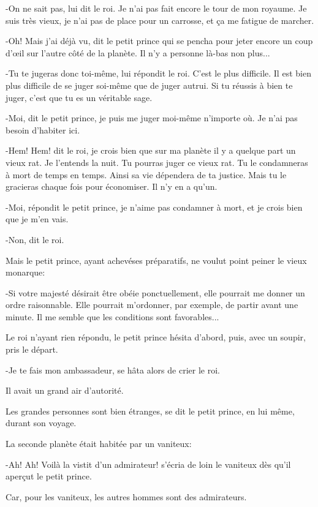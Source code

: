 \documentclass{report}
\begin{document}
-On ne sait pas, lui dit le roi. Je n'ai pas fait encore le tour de mon royaume. Je suis très vieux, je n'ai pas de place pour un carrosse, et ça me fatigue de marcher.

-Oh! Mais j'ai déjà vu, dit le petit prince qui se pencha pour jeter encore un coup d'œil sur l'autre côté de la planète. Il n'y a personne là-bas non plus...

-Tu te jugeras donc toi-même, lui répondit le roi. C'est le plus difficile. Il est bien plus difficile de se juger soi-même que de juger autrui. Si tu réussis à bien te juger, c'est que tu es un véritable sage.

-Moi, dit le petit prince, je puis me juger moi-même n'importe où. Je n'ai pas besoin d'habiter ici.

-Hem! Hem! dit le roi, je crois bien que sur ma planète il y a quelque part un vieux rat. Je l'entends la nuit. Tu pourras juger ce vieux rat. Tu le condamneras à mort de temps en temps. Ainsi sa vie dépendera de ta justice. Mais tu le gracieras chaque fois pour économiser. Il n'y en a qu'un.

-Moi, répondit le petit prince, je n'aime pas condamner à mort, et je crois bien que je m'en vais.

-Non, dit le roi.

Mais le petit prince, ayant achevéses préparatifs, ne voulut point peiner le vieux monarque:

-Si votre majesté désirait être obéie ponctuellement, elle pourrait me donner un ordre raisonnable. Elle pourrait m'ordonner, par exemple, de partir avant une minute. Il me semble que les conditions sont favorables...

Le roi n'ayant rien répondu, le petit prince hésita d'abord, puis, avec un soupir, pris le départ.

-Je te fais mon ambassadeur, se hâta alors de crier le roi.

Il avait un grand air d'autorité.

Les grandes personnes sont bien étranges, se dit le petit prince, en lui même, durant son voyage.

\parachapter{} %

La seconde planète était habitée par un vaniteux:

-Ah! Ah! Voilà la vistit d'un admirateur! s'écria de loin le vaniteux dès qu'il aperçut le petit prince. 


Car, pour les vaniteux, les autres hommes sont des admirateurs.
\end{document}
